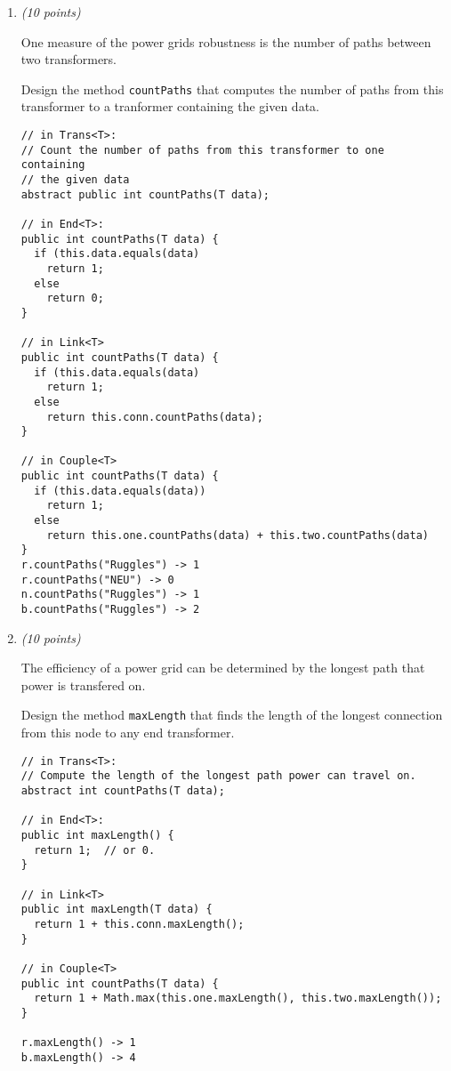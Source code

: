 \documentclass[11pt]{article}
\newcounter{Pctr}
\newenvironment{problem}{\stepcounter{Pctr}%
\begin{description}
\item[\noindent{\bf Problem} \arabic{Pctr}] 
\end{description}}{\relax}
\begin{document}
\begin{problem}
\begin{enumerate}
\newpage
\item {\em{(10 points)}}

One measure of the power grids robustness is the number of paths 
between two transformers.

Design the method {\tt countPaths} that computes the number of paths
from this transformer to a tranformer containing the given data.

\begsol{\vspace{0.5in}}

\begin{verbatim}
// in Trans<T>:
// Count the number of paths from this transformer to one containing 
// the given data
abstract public int countPaths(T data);

// in End<T>:
public int countPaths(T data) {
  if (this.data.equals(data)
    return 1;
  else 
    return 0;
}

// in Link<T>
public int countPaths(T data) {
  if (this.data.equals(data)
    return 1;
  else 
    return this.conn.countPaths(data);
}

// in Couple<T>
public int countPaths(T data) {
  if (this.data.equals(data))
    return 1;
  else
    return this.one.countPaths(data) + this.two.countPaths(data)
}
r.countPaths("Ruggles") -> 1
r.countPaths("NEU") -> 0
n.countPaths("Ruggles") -> 1
b.countPaths("Ruggles") -> 2
\end{verbatim}
\endsol

\newpage
\item {\em{(10 points)}}

The efficiency of a power grid can be determined by the longest path
that power is transfered on.

Design the method {\tt maxLength} that finds the length of the longest
connection from this node to any end transformer.

\begsol{\vspace{0.5in}}
\begin{verbatim}
// in Trans<T>:
// Compute the length of the longest path power can travel on.
abstract int countPaths(T data);

// in End<T>:
public int maxLength() {
  return 1;  // or 0.
}

// in Link<T>
public int maxLength(T data) {
  return 1 + this.conn.maxLength();
}

// in Couple<T>
public int countPaths(T data) {
  return 1 + Math.max(this.one.maxLength(), this.two.maxLength());
}

r.maxLength() -> 1
b.maxLength() -> 4
\end{verbatim}
\endsol

\newpage
\end{enumerate}
\end{problem}
\end{document}
